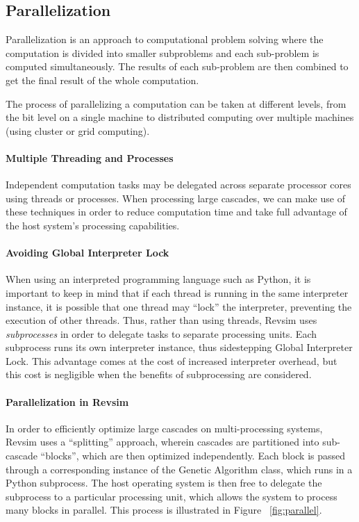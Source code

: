 \subsection{Parallelization}
Parallelization is an approach to computational problem solving where the computation is divided into smaller subproblems and each sub-problem is computed simultaneously. The results of each sub-problem are then combined to get the final result of the whole computation.

The process of parallelizing a computation can be taken at different levels, from the bit level on a single machine to distributed computing over multiple machines (using cluster or grid computing).

\paragraph{Multiple Threading and Processes} Independent computation tasks may be delegated across separate processor cores using threads or processes. When processing large cascades, we can make use of these techniques in order to reduce computation time and take full advantage of the host system's processing capabilities.

\paragraph{Avoiding Global Interpreter Lock} When using an interpreted programming language such as Python, it is important to keep in mind that if each thread is running in the same interpreter instance, it is possible that one thread may ``lock'' the interpreter, preventing the execution of other threads. Thus, rather than using threads, Revsim uses \emph{subprocesses} in order to delegate tasks to separate processing units. Each subprocess runs its own interpreter instance, thus sidestepping Global Interpreter Lock. This advantage comes at the cost of increased interpreter overhead, but this cost is negligible when the benefits of subprocessing are considered. 

\paragraph{Parallelization in Revsim} 
In order to efficiently optimize large cascades on multi-processing systems, Revsim uses a ``splitting'' approach, wherein cascades are partitioned into sub-cascade ``blocks'', which are then optimized independently. Each block is passed through a corresponding instance of the Genetic Algorithm class, which runs in a Python subprocess. The host operating system is then free to delegate the subprocess to a particular processing unit, which allows the system to process many blocks in parallel. This process is illustrated in Figure ~\ref{fig:parallel}.

